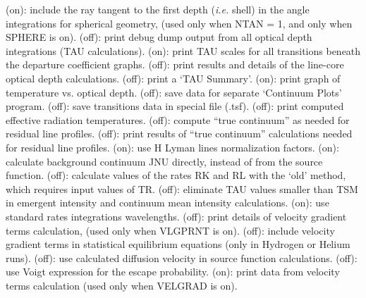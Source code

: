 \space \vbox { (on): \bang
include the ray tangent to the first depth ({\it i.e.} shell) in the angle
integrations for spherical geometry, (used only when NTAN = 1, and only
when SPHERE \break is on).}
\space \vbox { (off): \bang
print debug dump output from all optical depth integrations (TAU calculations).}
\space \vbox { (on): \bang
print TAU scales for all transitions beneath the departure coefficient graphs.}
\space \vbox { (off): \bang
print results and details of the line-core optical depth calculations.}
\space \vbox { (off): \bang
print a `TAU Summary'.}
\space \vbox { (on): \bang
print graph of temperature vs. optical depth.}
\space \vbox { (off): \bang
save data for separate `Continuum Plots' program.}
\space \vbox { (off): \bang
save transitions data in special file (.tsf).}
\space \vbox { (off): \bang
print computed effective radiation temperatures.}
\space \vbox { (off): \bang
compute ``true continuum'' as needed for residual line profiles.}
\space \vbox { (off): \bang
print results of ``true continuum'' calculations needed for residual
line profiles.}
\space \vbox { (on): \bang
use H Lyman lines normalization factors.}
\space \vbox { (on): \bang
calculate background continuum JNU directly, instead of from the source
\break function.}
\space \vbox { (off): \bang
calculate values of the rates RK and RL with the `old' method, which
requires input values of TR.}
\space \vbox { (off): \bang
eliminate TAU values smaller than TSM in emergent intensity and
continuum mean intensity calculations.}
\space \vbox { (on): \bang
use standard rates integrations wavelengths.}
\space \vbox { (off): \bang
print details of velocity gradient terms calculation, (used only when
VLGPRNT is on).}
\space \vbox { (off): \bang
include velocity gradient terms in statistical equilibrium equations
(only in Hydrogen or Helium runs).}
\space \vbox { (off): \bang
use calculated diffusion velocity in source function calculations.}
\space \vbox { (off): \bang
use Voigt expression for the escape probability.}
\space \vbox { (on): \bang
print data from velocity terms calculation (used only when VELGRAD
is on).}
